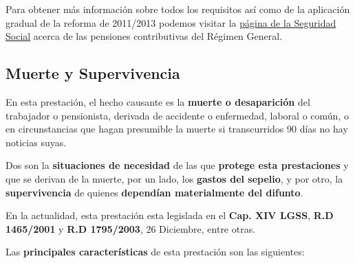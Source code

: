 Para obtener más información sobre todos los requisitos así como de la aplicación gradual de la reforma de 2011/2013 podemos visitar la \href{https://www.seg-social.es/wps/portal/wss/internet/Trabajadores/PrestacionesPensionesTrabajadores/10963/28393/28396}{página de la Seguridad Social} acerca de las pensiones contributivas del Régimen General.

\subsection{Muerte y Supervivencia}
En esta prestación, el hecho causante es la \textbf{muerte o desaparición} del trabajador o pensionista, derivada de accidente o enfermedad, laboral o común, o en circunstancias que hagan presumible la muerte si transcurridos 90 días no hay noticias suyas.

Dos son la \textbf{situaciones de necesidad} de las que \textbf{protege esta prestaciones} y que se derivan de la muerte, por un lado, los \textbf{gastos del sepelio}, y por otro, la \textbf{supervivencia} de quienes \textbf{dependían materialmente del difunto}.

En la actualidad, esta prestación esta legislada en el \textbf{Cap. XIV LGSS}, \textbf{R.D 1465/2001} y \textbf{R.D 1795/2003}, 26 Diciembre, entre otras.

Las \textbf{principales características} de esta prestación son las siguientes:

